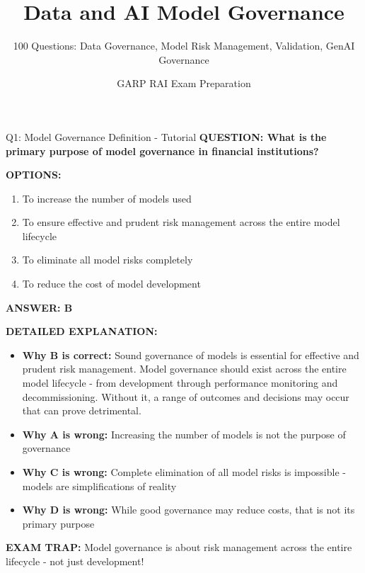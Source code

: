 \documentclass[8pt]{beamer}
\title{Data and AI Model Governance}
\subtitle{100 Questions: Data Governance, Model Risk Management, Validation, GenAI Governance}
\author{GARP RAI Exam Preparation}
\date{}
\begin{document}
	
	\begin{frame}
		\titlepage
	\end{frame}
	
	
	\begin{frame}{Q1: Model Governance Definition - Tutorial}
		\fontsize{6.5}{7.5}\selectfont
		\textbf{QUESTION: What is the primary purpose of model governance in financial institutions?}
		
		\vspace{0.1cm}
		\textbf{OPTIONS:}
		\begin{enumerate}
			\item To increase the number of models used
			\item To ensure effective and prudent risk management across the entire model lifecycle
			\item To eliminate all model risks completely
			\item To reduce the cost of model development
		\end{enumerate}
		
		\vspace{0.1cm}
		\textcolor{myblue}{\textbf{ANSWER: B}}
		
		\vspace{0.1cm}
		\textbf{DETAILED EXPLANATION:}
		\begin{itemize}
			\item \textbf{Why B is correct:} Sound governance of models is essential for effective and prudent risk management. Model governance should exist across the entire model lifecycle - from development through performance monitoring and decommissioning. Without it, a range of outcomes and decisions may occur that can prove detrimental.
			\item \textbf{Why A is wrong:} Increasing the number of models is not the purpose of governance
			\item \textbf{Why C is wrong:} Complete elimination of all model risks is impossible - models are simplifications of reality
			\item \textbf{Why D is wrong:} While good governance may reduce costs, that is not its primary purpose
		\end{itemize}
		
		\textcolor{myred}{\textbf{EXAM TRAP:}} Model governance is about \textcolor{myblue}{risk management across the entire lifecycle} - not just development!
	\end{frame}
	
\end{document}
